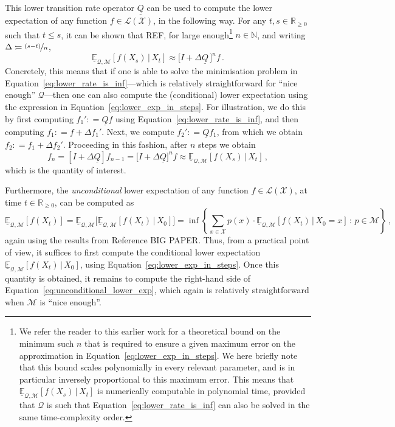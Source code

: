 \documentclass[twoside,11pt]{article}
\newcommand{\nats}{\mathbb{N}}
\newcommand{\reals}{\mathbb{R}}
\newcommand{\realsnonneg}{\reals_{\geq 0}}
\newcommand{\states}{\mathcal{X}}
\newcommand{\lexp}{\underline{\mathbb{E}}_{\rateset,\mathcal{M}}}
\newcommand{\gambles}{\mathcal{L}}
\newcommand{\gamblesX}{\gambles(\states)}
\newcommand{\rateset}{\mathcal{Q}}
\newcommand{\lrate}{\underline{Q}}
\newcommand{\coloneqq}{:\!=}
\begin{document}
This lower transition rate operator $\lrate$ can be used to compute the lower expectation of any function $f\in\gamblesX$, in the following way. For any $t,s\in\realsnonneg$ such that $t\leq s$, it can be shown that REF, for large enough\footnote{We refer the reader to this earlier work for a theoretical bound on the minimum such $n$ that is required to ensure a given maximum error on the approximation in Equation~\eqref{eq:lower_exp_in_steps}. We here briefly note that this bound scales polynomially in every relevant parameter, and is in particular inversely proportional to this maximum error. This means that $\lexp[f(X_s)\,\vert\,X_t]$ is numerically computable in polynomial time, provided that $\rateset$ is such that Equation~\eqref{eq:lower_rate_is_inf} can also be solved in the same time-complexity order.} $n\in\nats$, and writing $\Delta\coloneqq \nicefrac{(s-t)}{n}$,
\begin{equation}\label{eq:lower_exp_in_steps}
\lexp[f(X_s)\,\vert\,X_t] \approx \bigl[I + \Delta\lrate\,\bigr]^nf\,.
\end{equation}
Concretely, this means that if one is able to solve the minimisation problem in Equation~\eqref{eq:lower_rate_is_inf}---which is relatively straightforward for ``nice enough'' $\rateset$---then one can also compute the (conditional) lower expectation using the expression in Equation~\ref{eq:lower_exp_in_steps}. For illustration, we do this by first computing $f_1'\coloneqq \lrate f$ using Equation~\eqref{eq:lower_rate_is_inf}, and then computing $f_1\coloneqq f + \Delta f_1'$. Next, we compute $f_2'\coloneqq \lrate f_1$, from which we obtain $f_2\coloneqq f_1 + \Delta f_2'$. Proceeding in this fashion, after $n$ steps we obtain
\begin{equation*}
f_n = [I+\Delta\lrate]f_{n-1} = \bigl[I+\Delta\lrate\bigr]^nf \approx \underline{\mathbb{E}}_{\rateset,\mathcal{M}}[f(X_s)\,\vert\,X_t]\,,
\end{equation*}
which is the quantity of interest.

Furthermore, the \emph{unconditional} lower expectation of any function $f\in\gamblesX$, at time $t\in\realsnonneg$, can be computed as
\begin{equation}\label{eq:unconditional_lower_exp}
\underline{\mathbb{E}}_{\rateset,\mathcal{M}}[f(X_t)] = \underline{\mathbb{E}}_{\rateset,\mathcal{M}}\bigl[\underline{\mathbb{E}}_{\rateset,\mathcal{M}}[f(X_t)\,\vert\,X_0]\bigr] = \inf\left\{ \sum_{x\in\states} p(x)\cdot\underline{\mathbb{E}}_{\rateset,\mathcal{M}}[f(X_t)\,\vert\,X_0=x]\,:\,p\in\mathcal{M}  \right\}\,,
\end{equation}
again using the results from Reference BIG PAPER. Thus, from a practical point of view, it suffices to first compute the conditional lower expectation $\underline{\mathbb{E}}_{\rateset,\mathcal{M}}[f(X_t)\,\vert\,X_0]$, using Equation~\eqref{eq:lower_exp_in_steps}. Once this quantity is obtained, it remains to compute the right-hand side of Equation~\eqref{eq:unconditional_lower_exp}, which again is relatively straightforward when $\mathcal{M}$ is ``nice enough''.
\end{document}
